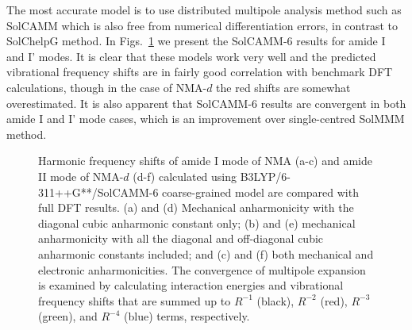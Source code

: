\documentclass[a4paper,titlepage,twoside,fleqn,12pt]{book}
\begin{document}
\begin{refsection}
The most accurate model is to use
distributed multipole analysis method such as SolCAMM
which is also free from numerical differentiation errors,
in contrast to SolChelpG method.
In Figs.~\ref{f:solcamm} we present the SolCAMM-6 results 
for amide I and I' modes. It is clear that
these models work very well and the predicted 
vibrational frequency shifts are in fairly good correlation
with benchmark DFT calculations, though in the case of NMA-$d$
the red shifts are somewhat overestimated.
It is also apparent that SolCAMM-6 results are
convergent in both amide I and I' mode cases, which is
an improvement over single\hyp{}centred SolMMM method.
%
\begin{figure}[t!]
\centering
\setlength\fboxsep{0.4pt}
\setlength\fboxrule{0.5pt}
\caption{
Harmonic frequency shifts of amide I mode of NMA (a-c) and amide II mode
of NMA-$d$ (d-f) calculated using
B3LYP/6-311++G**/SolCAMM-6 coarse\hyp{}grained model
are compared with full DFT results. (a) and (d) Mechanical anharmonicity with the
diagonal cubic anharmonic constant only; (b) and (e) mechanical anharmonicity with
all the diagonal and off\hyp{}diagonal cubic anharmonic constants included; and
(c) and (f) both mechanical and electronic anharmonicities.
The convergence of multipole
expansion is examined by calculating interaction energies and vibrational frequency
shifts that are summed up to $R^{-1}$ (black), $R^{-2}$ (red), $R^{-3}$ (green), and
$R^{-4}$ (blue) terms, respectively.
\label{f:solcamm}}
\end{figure}
%


\end{refsection}
\end{document}
